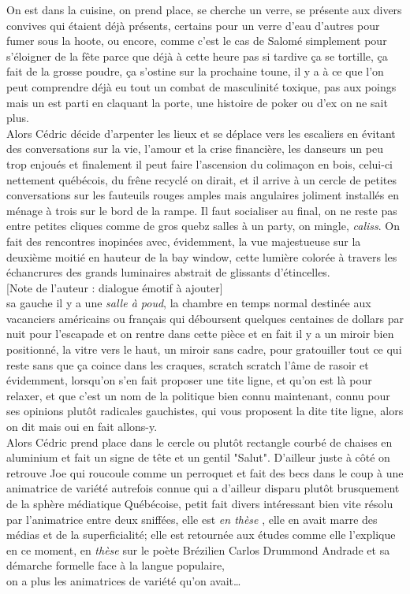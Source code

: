 \documentclass{article}
\begin{document}
On est dans la cuisine, on prend place, se cherche un verre, se présente
aux divers convives qui étaient déjà présents, certains pour un verre d'eau
d'autres pour fumer sous la hoote, ou encore, comme c'est le cas de Salomé
simplement pour s'éloigner de la fête parce que déjà à cette heure pas si
tardive  ça se tortille, ça fait de la grosse poudre, ça s'ostine sur la
prochaine toune, il y a à ce que l'on peut comprendre déjà eu tout
un combat de masculinité toxique, pas aux poings mais un est parti en claquant
la porte, une histoire de poker ou d'ex on ne sait plus.\\

Alors Cédric décide d'arpenter les lieux et se déplace vers les escaliers en
évitant des conversations sur la vie, l'amour et la crise financière, les
danseurs un peu trop enjoués et finalement il peut faire l'ascension du
colimaçon en bois, celui-ci nettement québécois, du frêne recyclé on dirait, et
il arrive à un cercle de petites conversations sur les fauteuils rouges amples
mais angulaires joliment installés en ménage à trois sur le bord de la rampe. Il
faut socialiser au final, on ne reste pas entre petites cliques comme de gros
quebz salles à un party, on mingle, \emph{caliss}. On fait des rencontres
inopinées avec, évidemment, la vue majestueuse sur la deuxième moitié en hauteur
de la bay window, cette lumière colorée à travers les échancrures des grands
luminaires abstrait de glissants d'étincelles.
\\

[Note de l'auteur : dialogue émotif à ajouter]\\[1em]

 sa gauche il y a une \emph{salle à poud}, la chambre en temps normal destinée
aux vacanciers américains ou français qui déboursent quelques centaines de
dollars par nuit pour l'escapade et on rentre dans cette pièce et en fait il y a
un miroir bien positionné, la vitre vers le haut, un miroir sans cadre, pour
gratouiller tout ce qui reste sans que ça coince dans les craques, scratch
scratch l'âme de rasoir et évidemment, lorsqu'on s'en fait proposer une tite
ligne, et qu'on est là pour relaxer, et que c'est un nom de la politique bien
connu maintenant, connu pour ses opinions plutôt radicales gauchistes, qui vous
proposent la dite tite ligne, alors on dit mais oui en fait allons-y.\\

Alors Cédric prend place dans le cercle ou plutôt rectangle courbé de chaises en
aluminium et fait un signe de tête et un gentil "Salut". D'ailleur juste à côté
on retrouve Joe qui roucoule comme un perroquet et fait des becs dans le coup à
une animatrice de variété autrefois connue qui a d'ailleur disparu plutôt
brusquement de la sphère médiatique Québécoise, petit fait divers intéressant
bien vite résolu par l'animatrice entre deux sniffées, elle est \emph{en thèse}
, elle en avait marre des médias et de la superficialité; elle est retournée aux
études comme elle l'explique en ce moment, en \emph{thèse} sur le poète
Brézilien Carlos Drummond Andrade et sa démarche formelle face à la langue
populaire, \\ on a plus les animatrices de variété qu'on avait\ldots
\end{document}
